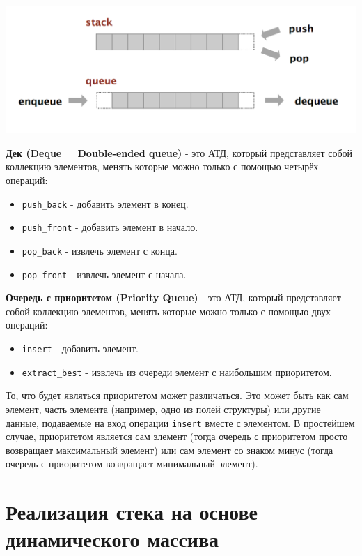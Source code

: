 \documentclass[10pt]{article}
\begin{document}
\begin{center}
\includegraphics[scale=0.31]{../images/stack_queue.png}
\end{center}

\textbf{Дек (Deque = Double-ended queue)} - это АТД, который представляет собой коллекцию элементов, менять которые можно только с помощью четырёх операций:
\begin{itemize}
\item \texttt{push\_back} - добавить элемент в конец.
\item \texttt{push\_front} - добавить элемент в начало.
\item \texttt{pop\_back} - извлечь элемент с конца.
\item \texttt{pop\_front} - извлечь элемент с начала.\\
\end{itemize}

\textbf{Очередь с приоритетом (Priority Queue)} - это АТД, который представляет собой коллекцию элементов, менять которые можно только с помощью двух операций:
\begin{itemize}
\item \texttt{insert} - добавить элемент.
\item \texttt{extract\_best} - извлечь из очереди элемент с наибольшим приоритетом. 
\end{itemize}
То, что будет являться приоритетом может различаться. Это может быть как сам элемент, часть элемента (например, одно из полей структуры) или другие данные, подаваемые на вход операции \texttt{insert} вместе с элементом. В простейшем случае, приоритетом является сам элемент (тогда очередь с приоритетом просто возвращает максимальный элемент) или сам элемент со знаком минус (тогда очередь с приоритетом возвращает минимальный элемент).


\newpage
\section*{Реализация стека на основе динамического массива}
\end{document}
